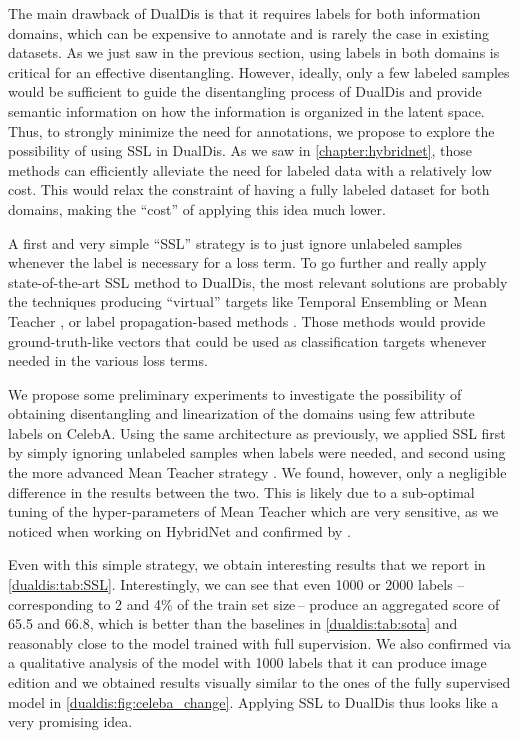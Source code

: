 The main drawback of DualDis is that it requires labels for both information domains, which can be expensive to annotate and is rarely the case in existing datasets. As we just saw in the previous section, using labels in both domains is critical for an effective disentangling. However, ideally, only a few labeled samples would be sufficient to guide the disentangling process of DualDis and provide semantic information on how the information is organized in the latent space.
%
Thus, to strongly minimize the need for annotations, we propose to explore the possibility of using \acf{SSL} in DualDis. As we saw in \autoref{chapter:hybridnet}, those methods can efficiently alleviate the need for labeled data with a relatively low cost. This would relax the constraint of having a fully labeled dataset for both domains, making the ``cost'' of applying this idea much lower.

A first and very simple ``\ac{SSL}'' strategy is to just ignore unlabeled samples whenever the label is necessary for a loss term. To go further and really apply state-of-the-art \ac{SSL} method to DualDis, the most relevant solutions are probably the techniques producing ``virtual'' targets like Temporal Ensembling \citep{Laine2016} or Mean Teacher \citep{tarvainen2017mean}, or label propagation-based methods \citep{iscen2019label}. Those methods would provide ground-truth-like vectors that could be used as classification targets whenever needed in the various loss terms.

We propose some preliminary experiments to investigate the possibility of obtaining disentangling and linearization of the domains using few attribute labels on CelebA. Using the same architecture as previously, we applied \ac{SSL} first by simply ignoring unlabeled samples when labels were needed, and second using the more advanced Mean Teacher strategy \citep{tarvainen2017mean}. We found, however, only a negligible difference in the results between the two. This is likely due to a sub-optimal tuning of the hyper-parameters of Mean Teacher which are very sensitive, as we noticed when working on HybridNet and confirmed by \citet{oliver2018realistic}.

Even with this simple strategy, we obtain interesting results that we report in \autoref{dualdis:tab:SSL}. Interestingly, we can see that even 1000 or 2000 labels --\,corresponding to 2 and 4\% of the train set size\,-- produce an aggregated score of 65.5 and 66.8, which is better than the baselines in \autoref{dualdis:tab:sota} and reasonably close to the model trained with full supervision. We also confirmed via a qualitative analysis of the model with 1000 labels that it can produce image edition and we obtained results visually similar to the ones of the fully supervised model in \autoref{dualdis:fig:celeba_change}. Applying \ac{SSL} to DualDis thus looks like a very promising idea.


